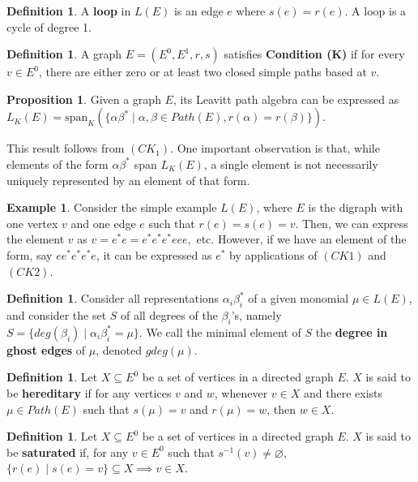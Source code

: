 \documentclass[12pt]{amsart}
\theoremstyle{plain} \numberwithin{equation}{section}
\theoremstyle{definition}
\newtheorem{proposition}[theorem]{Proposition}
\newtheorem{definition}[theorem]{Definition}
\newtheorem{example}[theorem]{Example}
\theoremstyle{definition}
\begin{document}
\begin{definition}
   A \textbf{loop} in $L(E)$ is an edge $e$ where $s(e) = r(e)$. A loop is a cycle of degree 1. 
\end{definition} 

\begin{definition}
    A graph $E = (E^0, E^1, r, s)$ satisfies \textbf{Condition (K)} if for every $v \in E^0$, there are either zero or at least two closed simple paths based at $v$. 
\end{definition}

\begin{proposition}\label{2.12}
    Given a graph $E$, its Leavitt path algebra can be expressed as $L_K(E) = \text{span}_K(\{\alpha\beta^* \mid \alpha,\beta \in Path(E), r(\alpha) = r(\beta) \}).$
\end{proposition}
    This result follows from $(CK_1).$ One important observation is that, while elements of the form $\alpha\beta^*$ span $L_K(E)$, a single element is not necessarily uniquely represented by an element of that form. 

\begin{example}
    Consider the simple example $L(E)$, where $E$ is the digraph with one vertex $v$ and one edge $e$ such that $r(e) = s(e) = v$. Then, we can express the element $v$ as $v = e^*e = e^*e^*e^*eee,$ etc. However, if we have an element of the form, say $ee^*e^*e^*e$, it can be expressed as $e^*$ by applications of $(CK1)$ and $(CK2)$. 
\end{example}

\begin{definition}
    Consider all representations $\alpha_i\beta_i^*$ of a given monomial $\mu\in L(E)$, and consider the set $S$ of all degrees of the $\beta_i$'s, namely $S = \{deg(\beta_i) \mid \alpha_i\beta_i^* = \mu\}$. We call the minimal element of $S$ the \textbf{degree in ghost edges} of $\mu$, denoted $gdeg(\mu)$. 
\end{definition}

\begin{definition}
    Let $X\subseteq E^0$ be a set of vertices in a directed graph $E$. $X$ is said to be \textbf{hereditary} if for any vertices $v$ and $w$, whenever $v\in X$ and there exists $\mu\in Path(E)$ such that $s(\mu) = v$ and $r(\mu) = w$, then $w\in X$. 
\end{definition}

\begin{definition}
    Let $X\subseteq E^0$ be a set of vertices in a directed graph $E$. $X$ is said to be \textbf{saturated} if, for any $v\in E^0$ such that $s^{-1}(v) \neq \varnothing$, $\{r(e) \mid s(e) = v\}\subseteq X \implies v\in X$. 
\end{definition}
\end{document}
